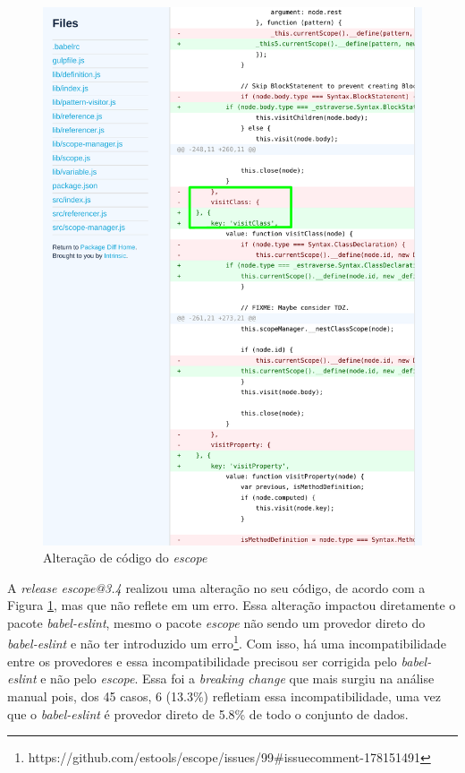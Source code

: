 \begin{itemize}
    \begin{figure}
        \centering
       \includegraphics[scale=0.7]{figuras/bc_category_incompatibles_providers.pdf}
        \caption{Alteração de código do \textit{escope}}
        \label{fig:bc_category_incompatibles_providers}
    \end{figure}{}

    A \textit{release escope@3.4} realizou uma alteração no seu código, de acordo com a Figura \ref{fig:bc_category_incompatibles_providers}, mas que não reflete em um erro. Essa alteração impactou diretamente o pacote \textit{babel-eslint}, mesmo o pacote \textit{escope} não sendo um provedor direto do \textit{babel-eslint} e não ter introduzido um erro\footnote{https://github.com/estools/escope/issues/99\#issuecomment-178151491}. Com isso, há uma incompatibilidade entre os provedores e essa incompatibilidade precisou ser corrigida pelo \textit{babel-eslint} e não pelo \textit{escope}. Essa foi a \textit{breaking change} que mais surgiu na análise manual pois, dos 45 casos, 6 (13.3\%) refletiam essa incompatibilidade, uma vez que o \textit{babel-eslint} é provedor direto de 5.8\% de todo o conjunto de dados.


\end{itemize}
